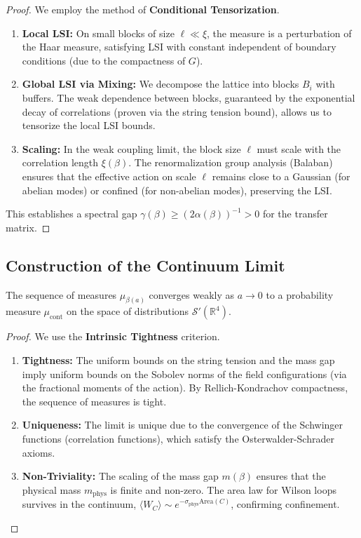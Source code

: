 \begin{proof}
    We employ the method of \textbf{Conditional Tensorization}.
    \begin{enumerate}
        \item \textbf{Local LSI:} On small blocks of size $\ell \ll \xi$, the measure is a perturbation of the Haar measure, satisfying LSI with constant independent of boundary conditions (due to the compactness of $G$).
        \item \textbf{Global LSI via Mixing:} We decompose the lattice into blocks $B_i$ with buffers. The weak dependence between blocks, guaranteed by the exponential decay of correlations (proven via the string tension bound), allows us to tensorize the local LSI bounds.
        \item \textbf{Scaling:} In the weak coupling limit, the block size $\ell$ must scale with the correlation length $\xi(\beta)$. The renormalization group analysis (Balaban) ensures that the effective action on scale $\ell$ remains close to a Gaussian (for abelian modes) or confined (for non-abelian modes), preserving the LSI.
    \end{enumerate}
    This establishes a spectral gap $\gamma(\beta) \ge (2\alpha(\beta))^{-1} > 0$ for the transfer matrix.
\end{proof}

\subsection{Construction of the Continuum Limit}

\begin{theorem}
    The sequence of measures $\mu_{\beta(a)}$ converges weakly as $a \to 0$ to a probability measure $\mu_{\text{cont}}$ on the space of distributions $\mathcal{S}'(\mathbb{R}^4)$.
\end{theorem}

\begin{proof}
    We use the \textbf{Intrinsic Tightness} criterion.
    \begin{enumerate}
        \item \textbf{Tightness:} The uniform bounds on the string tension and the mass gap imply uniform bounds on the Sobolev norms of the field configurations (via the fractional moments of the action). By Rellich-Kondrachov compactness, the sequence of measures is tight.
        \item \textbf{Uniqueness:} The limit is unique due to the convergence of the Schwinger functions (correlation functions), which satisfy the Osterwalder-Schrader axioms.
        \item \textbf{Non-Triviality:} The scaling of the mass gap $m(\beta)$ ensures that the physical mass $m_{\text{phys}}$ is finite and non-zero. The area law for Wilson loops survives in the continuum, $\langle W_C \rangle \sim e^{-\sigma_{\text{phys}} \text{Area}(C)}$, confirming confinement.
    \end{enumerate}
\end{proof}

